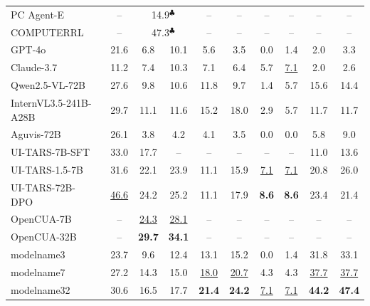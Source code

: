 \begin{table}[t]
{\begin{tabular}{@{}c l c cc cc cc cc @{}}
\multicolumn{2}{l}{PC Agent-E~\citeyearpar{he2025efficientagenttrainingcomputer}}   & -- & \multicolumn{2}{c}{14.9$^\clubsuit$} & -- & -- & -- & -- & -- & -- \\
\multicolumn{2}{l}{COMPUTERRL~\citeyearpar{lai2025computerrl}}   & -- & \multicolumn{2}{c}{47.3$^\clubsuit$} & -- & -- & -- & -- & -- & -- \\
\multicolumn{2}{l}{GPT-4o~\citeyearpar{hurst2024gpt}} & 21.6  & 6.8 & 10.1 & 5.6 & 3.5 & 0.0 & 1.4 & 2.0 & 3.3 \\
\multicolumn{2}{l}{Claude-3.7~\citeyearpar{anthropic2025claude37}}  & 11.2 & 7.4 & 10.3 & 7.1 & 6.4 & 5.7 & \underline{7.1} & 2.0 & 2.6 \\
\multicolumn{2}{l}{Qwen2.5-VL-72B~\citeyearpar{bai2025qwen25vl}}  & 27.6 & 9.8 & 10.6 & 11.8 & 9.7 & 1.4 & 5.7 & 15.6 & 14.4 \\
\multicolumn{2}{l}{InternVL3.5-241B-A28B~\citeyearpar{wang2025internvl35}}  & 29.7 & 11.1 & 11.6 & 15.2 & 18.0 & 2.9 & 5.7 & 11.7 & 11.7 \\
\multicolumn{2}{l}{Aguvis-72B~\citeyearpar{xu2024aguvis} }  & 26.1 & 3.8 & 4.2 & 4.1 & 3.5 & 0.0 & 0.0 & 5.8 & 9.0 \\
\multicolumn{2}{l}{UI-TARS-7B-SFT~\citeyearpar{qin2025uitars}}  & 33.0 & 17.7 & -- & -- & -- & -- & -- & 11.0 & 13.6 \\
\multicolumn{2}{l}{UI-TARS-1.5-7B~\citeyearpar{qin2025uitars} } & 31.6 & 22.1 & 23.9 & 11.1 & 15.9 & \underline{7.1} & \underline{7.1} & 20.8 & 26.0 \\
\multicolumn{2}{l}{UI-TARS-72B-DPO~\citeyearpar{qin2025uitars}}   &\underline{46.6} & 24.2  & 25.2 & 11.1 & 17.9 & \textbf{8.6} & \textbf{8.6} & 23.4 & 21.4 \\
\multicolumn{2}{l}{OpenCUA-7B~\citeyearpar{wang2025opencuaopenfoundationscomputeruse}}   & -- & \underline{24.3}  & \underline{28.1} & -- & -- & -- & -- & -- & -- \\
\multicolumn{2}{l}{OpenCUA-32B~\citeyearpar{wang2025opencuaopenfoundationscomputeruse}}   & -- & \textbf{29.7}  & \textbf{34.1} & -- & -- & -- & -- & -- & -- \\
\midrule
\multicolumn{2}{l}{modelname{3}} & 23.7 & 9.6 & 12.4 & 13.1 & 15.2 & 0.0 & 1.4 & 31.8 & 33.1 \\
\multicolumn{2}{l}{modelname{7}} & 27.2 & 14.3 & 15.0 & \underline{18.0} & \underline{20.7} & 4.3 & 4.3 & \underline{37.7} & \underline{37.7} \\
\multicolumn{2}{l}{modelname{32}} & 30.6 & 16.5 & 17.7 & \textbf{21.4} & \textbf{24.2} & \underline{7.1} & \underline{7.1} & \textbf{44.2} & \textbf{47.4} \\

\end{tabular}}
\end{table}
